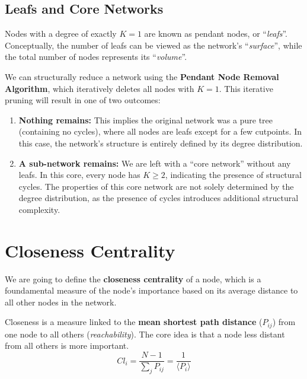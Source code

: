 \subsection{Leafs and Core Networks}

Nodes with a degree of exactly $K = 1$ are known as pendant nodes, or ``\textit{leafs}''. Conceptually, the number of leafs can be viewed as the network's ``\textit{surface}'', while the total number of nodes represents its ``\textit{volume}''.

We can structurally reduce a network using the \textbf{Pendant Node Removal Algorithm}, which iteratively deletes all nodes with $K=1$. This iterative pruning will result in one of two outcomes:
\begin{enumerate}
    \item \textbf{Nothing remains:} This implies the original network was a pure tree (containing no cycles), where all nodes are leafs except for a few cutpoints. In this case, the network's structure is entirely defined by its degree distribution.
    \item \textbf{A sub-network remains:} We are left with a ``core network'' without any leafs. In this core, every node has $K \ge 2$, indicating the presence of structural cycles. The properties of this core network are not solely determined by the degree distribution, as the presence of cycles introduces additional structural complexity.
\end{enumerate}

\section{Closeness Centrality}

We are going to define the \textbf{closeness centrality} of a node, which is a foundamental measure of the node's importance based on its average distance to all other nodes in the network.

\begin{definition}
    Closeness is a measure linked to the \textbf{mean shortest path distance} ($P_{ij}$) from one node to all others (\textit{reachability}). The core idea is that a node less distant from all others is more important.
    \[ Cl_i = \frac{N-1}{\sum_{j} P_{ij}} = \frac{1}{\langle P_i \rangle} \]
\end{definition}

